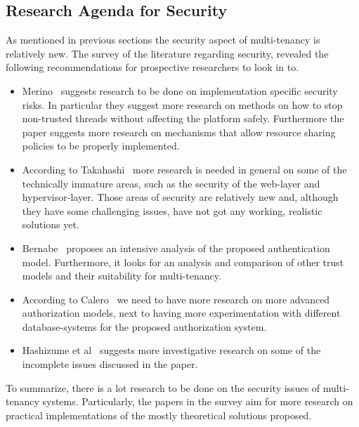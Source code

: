 \subsection{Research Agenda for Security}
As mentioned in previous sections the security aspect of multi-tenancy is relatively new.
The survey of the literature regarding security, revealed the following recommendations for prospective researchers to look in to. 
\begin{itemize}
    \item Merino~\cite{Merino2011Security} suggests research to be done on implementation specific security risks. In particular they suggest more research on methods on how to stop non-trusted threads without affecting the platform safely. Furthermore the paper suggests more research on mechanisms that allow resource sharing policies to be properly implemented.
    \item According to Takahashi~\cite{Takahashi2012Security} more research is needed in general on some of the technically immature areas, such as the security of the web-layer and hypervisor-layer.
Those areas of security are relatively new and, although they have some challenging issues, have not got any working, realistic solutions yet.
    \item Bernabe~\cite{Bernabe2012Auth} proposes an intensive analysis of the proposed authentication model.
Furthermore, it looks for an analysis and comparison of other trust models and their suitability for multi-tenancy.
    \item According to Calero~\cite{Calero2010Auth} we need to have more research on more advanced authorization models, next to having more experimentation with different database-systems for the proposed authorization system.
    \item Hashizume et al~\cite{Hashizume2013Security} suggests more investigative research on some of the incomplete issues discussed in the paper.
\end{itemize}
To summarize, there is a lot research to be done on the security issues of multi-tenancy systems.
Particularly, the papers in the survey aim for more research on practical implementations of the mostly theoretical solutions proposed.
